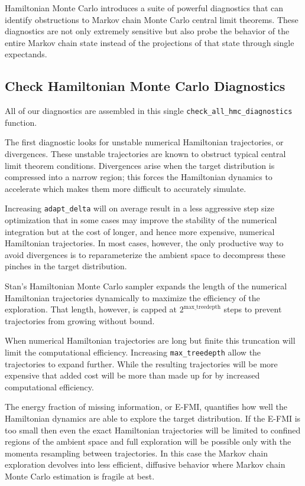 \documentclass[
  letterpaper,
  DIV=11,
  numbers=noendperiod]{scrartcl}
\begin{document}
Hamiltonian Monte Carlo introduces a suite of powerful diagnostics that
can identify obstructions to Markov chain Monte Carlo central limit
theorems. These diagnostics are not only extremely sensitive but also
probe the behavior of the entire Markov chain state instead of the
projections of that state through single expectands.

\hypertarget{check-hamiltonian-monte-carlo-diagnostics}{%
\subsection{Check Hamiltonian Monte Carlo
Diagnostics}\label{check-hamiltonian-monte-carlo-diagnostics}}

All of our diagnostics are assembled in this single
\texttt{check\_all\_hmc\_diagnostics} function.

The first diagnostic looks for unstable numerical Hamiltonian
trajectories, or divergences. These unstable trajectories are known to
obstruct typical central limit theorem conditions. Divergences arise
when the target distribution is compressed into a narrow region; this
forces the Hamiltonian dynamics to accelerate which makes them more
difficult to accurately simulate.

Increasing \texttt{adapt\_delta} will on average result in a less
aggressive step size optimization that in some cases may improve the
stability of the numerical integration but at the cost of longer, and
hence more expensive, numerical Hamiltonian trajectories. In most cases,
however, the only productive way to avoid divergences is to
reparameterize the ambient space to decompress these pinches in the
target distribution.

Stan's Hamiltonian Monte Carlo sampler expands the length of the
numerical Hamiltonian trajectories dynamically to maximize the
efficiency of the exploration. That length, however, is capped at
\(2^{\text{max\_treedepth}}\) steps to prevent trajectories from growing
without bound.

When numerical Hamiltonian trajectories are long but finite this
truncation will limit the computational efficiency. Increasing
\texttt{max\_treedepth} allow the trajectories to expand further. While
the resulting trajectories will be more expensive that added cost will
be more than made up for by increased computational efficiency.

The energy fraction of missing information, or E-FMI, quantifies how
well the Hamiltonian dynamics are able to explore the target
distribution. If the E-FMI is too small then even the exact Hamiltonian
trajectories will be limited to confined regions of the ambient space
and full exploration will be possible only with the momenta resampling
between trajectories. In this case the Markov chain exploration devolves
into less efficient, diffusive behavior where Markov chain Monte Carlo
estimation is fragile at best.
\end{document}
